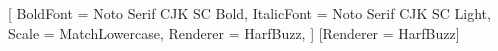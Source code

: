 \usepackage{fontspec}
\setmainfont{Noto Serif CJK SC}[
  BoldFont = Noto Serif CJK SC Bold,
  ItalicFont = Noto Serif CJK SC Light,
  Scale = MatchLowercase,
  Renderer = HarfBuzz,
]
\setsansfont{Noto Sans CJK SC}[Renderer = HarfBuzz]
\setmonofont{DejaVu Sans Mono}
